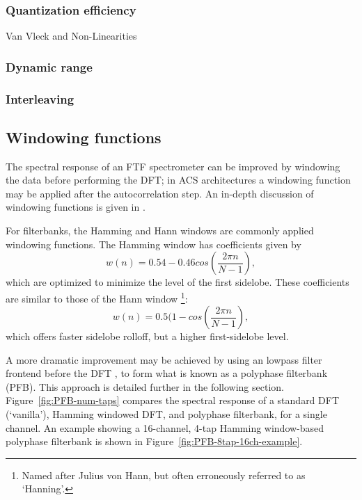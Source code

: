 \documentclass{ws-rv961x669}
\begin{document}
\subsubsection{Quantization efficiency}

Van Vleck and Non-Linearities

\subsubsection{Dynamic range}

\subsubsection{Interleaving}

\subsection{Windowing functions}

The spectral response of an FTF spectrometer can be improved by windowing
the data before performing the DFT; in ACS architectures a windowing
function may be applied after the autocorrelation step. An in-depth
discussion of windowing functions is given in \citet{SvenGade1987}. 

For filterbanks, the Hamming and Hann windows are commonly applied
windowing functions. The Hamming window has coefficients given by
\begin{equation}
w(n)=\mbox{0.54}-\mbox{0.46}cos\left(\frac{\mbox{2}\pi n}{N-1}\right),
\end{equation}
which are optimized to minimize the level of the first sidelobe. These
coefficients are similar to those of the Hann window%
\footnote{Named after Julius von Hann, but often erroneously referred to as
`Hanning'.%
}:
\begin{equation}
w(n)=\mbox{0.5}(\mbox{1}-cos\left(\frac{\mbox{2}\pi n}{N-1}\right),
\end{equation}
which offers faster sidelobe rolloff, but a higher first-sidelobe
level. 

A more dramatic improvement may be achieved by using an lowpass filter
frontend before the DFT \citep{Bellanger:1976p7898}, to form what
is known as a polyphase filterbank (PFB). This approach is detailed
further in the following section. Figure~\ref{fig:PFB-num-taps}
compares the spectral response of a standard DFT (`vanilla'), Hamming
windowed DFT, and polyphase filterbank, for a single channel. An example
showing a 16-channel, 4-tap Hamming window-based polyphase filterbank
is shown in Figure~\ref{fig:PFB-8tap-16ch-example}.
\end{document}
